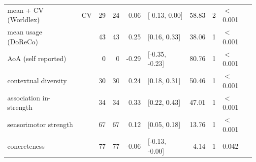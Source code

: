 \begin{table}[ht]
\begin{tabular}{llrrrlrrl}
  mean + CV (Worldlex) & CV & 29 & 24 & -0.06 & [-0.13, 0.00] & 58.83 & 2 & $<$ 0.001 \\ 
  mean usage (DoReCo) &  & 43 & 43 & 0.25 & [0.16, 0.33] & 38.06 & 1 & $<$ 0.001 \\ 
  AoA (self reported) &  & 0 & 0 & -0.29 & [-0.35, -0.23] & 80.76 & 1 & $<$ 0.001 \\ 
  contextual diversity &  & 30 & 30 & 0.24 & [0.18, 0.31] & 50.46 & 1 & $<$ 0.001 \\ 
  association in-strength &  & 34 & 34 & 0.33 & [0.22, 0.43] & 47.01 & 1 & $<$ 0.001 \\ 
  sensorimotor strength &  & 67 & 67 & 0.12 & [0.05, 0.18] & 13.76 & 1 & $<$ 0.001 \\ 
  concreteness &  & 77 & 77 & -0.06 & [-0.13, -0.00] & 4.14 & 1 & 0.042 \\ 
   \hline
\end{tabular}
\end{table}

